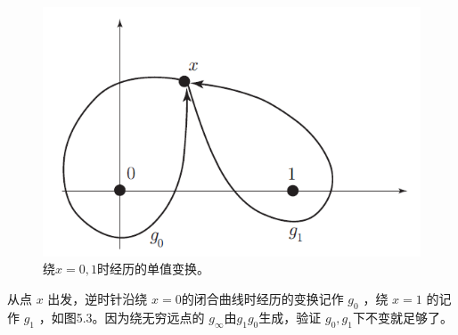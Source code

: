 \begin{figure}[h]
	\centering
	\includegraphics[width=0.6\linewidth]{fig/5.3.png}
	\caption{绕$x=0,1$时经历的单值变换。}
\end{figure}

从点 $x$ 出发，逆时针沿绕 $x=0 $的闭合曲线时经历的变换记作 $g_0$ ，绕 $x=1$ 的记作 $g_1$ ，如图5.3。因为绕无穷远点的 $g_\infty $由$ g_1g_0 $生成，验证 $g_0,g_1 $下不变就足够了。

